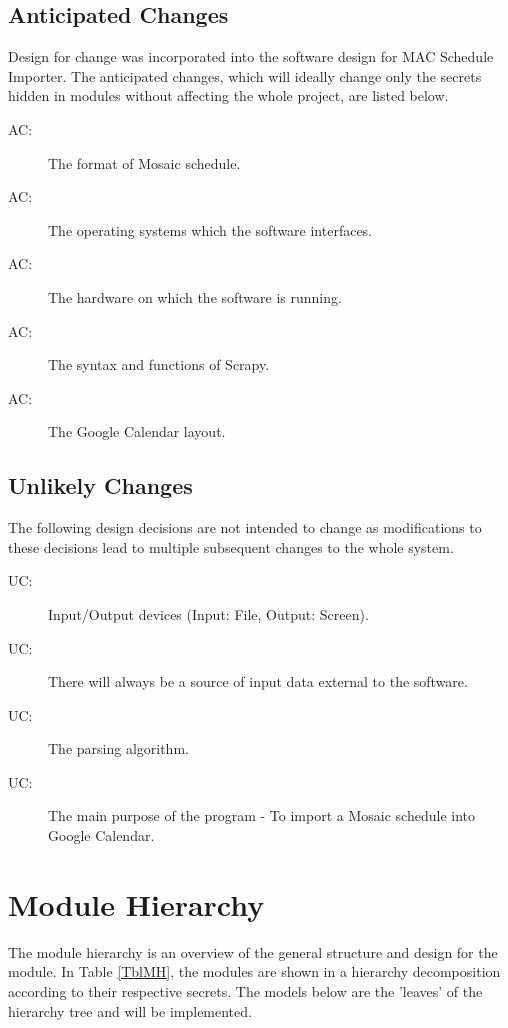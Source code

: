\documentclass[12pt, titlepage]{article}
\newcounter{acnum}
\newcommand{\actheacnum}{AC\theacnum}
\newcounter{ucnum}
\newcommand{\uctheucnum}{UC\theucnum}
\begin{document}
\subsection{Anticipated Changes} \label{SecAchange}
Design for change was incorporated into the software design for MAC Schedule Importer.   The anticipated changes, which will ideally change only the secrets hidden in modules without affecting the whole project, are listed below.

\begin{description}
\item[ \actheacnum \label{acParser}:] The format of Mosaic schedule.
\item[ \actheacnum \label{acOS}:] The operating systems which the software interfaces.
\item[ \actheacnum \label{achardware}:] The hardware on which the software is running.
\item[ \actheacnum \label{acScrapy}:] The syntax and functions of Scrapy.
\item[ \actheacnum \label{acGoogle}:] The Google Calendar layout.
\end{description}

\subsection{Unlikely Changes} \label{SecUchange}

The following design decisions are not intended to change as modifications to these decisions lead to multiple subsequent changes to the whole system.

\begin{description}
\item[ \uctheucnum \label{ucIO}:] Input/Output devices
  (Input: File, Output: Screen).
\item[ \uctheucnum \label{ucInput}:] There will always be
  a source of input data external to the software.
\item[ \uctheucnum \label{ucParse}:] The parsing algorithm.
\item[ \uctheucnum \label{ucGoal}:] The main purpose of the program - To import a Mosaic schedule into Google Calendar.
\end{description}

\section{Module Hierarchy} \label{SecMH}
The module hierarchy is an overview of the general structure and design for the module. In Table \ref{TblMH}, the modules are shown in a hierarchy decomposition according to their respective secrets. 
The models below are the 'leaves' of the hierarchy tree and will be implemented.
\end{document}
